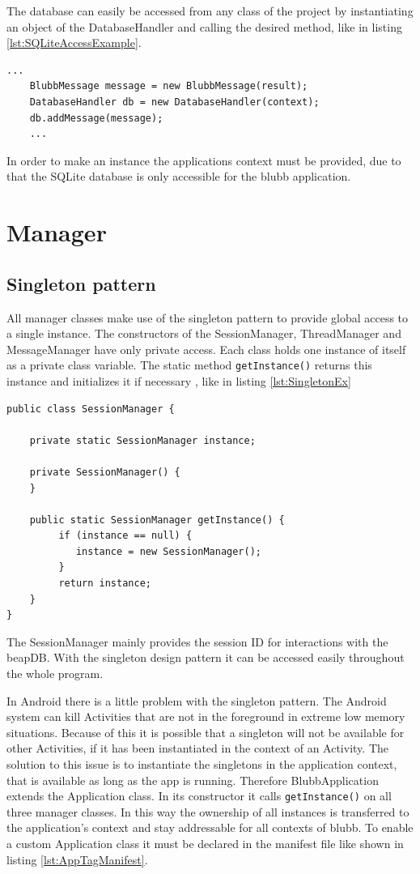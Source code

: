 \documentclass[12pt,a4paper,oneside]{report}
\newcommand{\appname}{blubb}
\newcommand{\beapDB}{beapDB}
\newcommand{\code}[1]{\lstinline{#1}}
\begin{document}
The database can easily be accessed from any class of the project by instantiating an object of the DatabaseHandler and calling the desired method, like in listing \ref{lst:SQLiteAccessExample}. 
\begin{lstlisting}[caption=Accessing the SQLite database, label=lst:SQLiteAccessExample]
	...
	BlubbMessage message = new BlubbMessage(result);
	DatabaseHandler db = new DatabaseHandler(context);
	db.addMessage(message);
	...
\end{lstlisting}
In order to make an instance the applications context must be provided, due to that the SQLite database is only accessible for the \appname{} application.

\section{Manager}

\subsection{Singleton pattern}
All manager classes make use of the singleton pattern to provide global access to a single instance. The constructors of the SessionManager, ThreadManager and MessageManager have only private access. Each class holds one instance of itself as a private class variable. The static method \code{getInstance()} returns this instance and initializes it if necessary \citep{cooper2000java}, like in listing \ref{lst:SingletonEx}

\begin{lstlisting}[caption=Example for the singleton pattern, label=lst:SingletonEx]
public class SessionManager {

	private static SessionManager instance;
	
	private SessionManager() {
	}
	
	public static SessionManager getInstance() {
		 if (instance == null) {
		 	instance = new SessionManager();
		 }
		 return instance;
	}
}

\end{lstlisting}

The SessionManager mainly provides the session ID for interactions with the \beapDB{}. With the singleton design pattern it can be accessed easily throughout the whole program. 


In Android there is a little problem with the singleton pattern.
The Android system can kill Activities that are not in the foreground in extreme low memory situations. Because of this it is possible that a singleton will not be available for other Activities, if it has been instantiated in the context of an Activity. 
The solution to this issue is to instantiate the singletons in the application context, that is available as long as the app is running. Therefore BlubbApplication extends the Application class. In its constructor it calls \code{getInstance()} on all three manager classes. In this way the ownership of all instances is transferred to the application's context and stay addressable for all contexts of \appname{}.
To enable a custom Application class it must be declared in the manifest file like shown in listing \ref{lst:AppTagManifest}.
\end{document}
